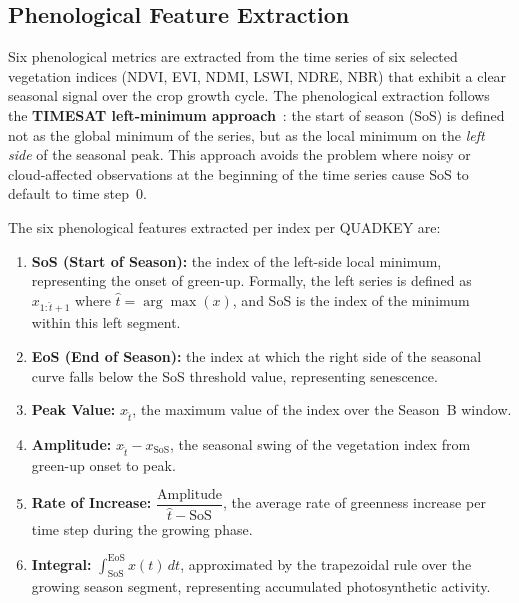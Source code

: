 \subsection{Phenological Feature Extraction}
\label{subsec:pheno_features}

Six phenological metrics are extracted from the time series of six
selected vegetation indices (NDVI, EVI, NDMI, LSWI, NDRE, NBR) that
exhibit a clear seasonal signal over the crop growth cycle. The
phenological extraction follows the \textbf{TIMESAT left-minimum
approach}~\cite{jonsson2004}: the start of season (SoS) is defined not
as the global minimum of the series, but as the local minimum on the
\emph{left side} of the seasonal peak. This approach avoids the problem
where noisy or cloud-affected observations at the beginning of the time
series cause SoS to default to time step~0.

The six phenological features extracted per index per QUADKEY are:

\begin{enumerate}
    \item \textbf{SoS (Start of Season):} the index of the left-side
          local minimum, representing the onset of green-up. Formally,
          the left series is defined as $x_{1:\hat{t}+1}$ where
          $\hat{t} = \arg\max(x)$, and SoS is the index of the minimum
          within this left segment.
    \item \textbf{EoS (End of Season):} the index at which the right side
          of the seasonal curve falls below the SoS threshold value,
          representing senescence.
    \item \textbf{Peak Value:} $x_{\hat{t}}$, the maximum value of the
          index over the Season~B window.
    \item \textbf{Amplitude:} $x_{\hat{t}} - x_{\mathrm{SoS}}$, the
          seasonal swing of the vegetation index from green-up onset to
          peak.
    \item \textbf{Rate of Increase:} $\dfrac{\mathrm{Amplitude}}{\hat{t} -
          \mathrm{SoS}}$, the average rate of greenness increase per time
          step during the growing phase.
    \item \textbf{Integral:} $\displaystyle\int_{\mathrm{SoS}}^{\mathrm{EoS}}
          x(t)\,dt$, approximated by the trapezoidal rule over the growing
          season segment, representing accumulated photosynthetic activity.
\end{enumerate}


